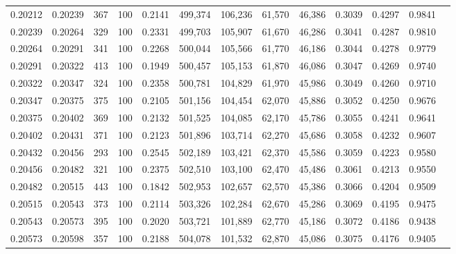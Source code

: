 \begin{tabular}{rrrrrrrrrrrrr}
0.20212 & 0.20239 &   367 & 100 &                                     0.2141 & 499,374 & 106,236 &  61,570 &  46,386 & 0.3039 & 0.4297 & 0.9841 \\
0.20239 & 0.20264 &   329 & 100 &                                     0.2331 & 499,703 & 105,907 &  61,670 &  46,286 & 0.3041 & 0.4287 & 0.9810 \\
0.20264 & 0.20291 &   341 & 100 &                                     0.2268 & 500,044 & 105,566 &  61,770 &  46,186 & 0.3044 & 0.4278 & 0.9779 \\
0.20291 & 0.20322 &   413 & 100 &                                     0.1949 & 500,457 & 105,153 &  61,870 &  46,086 & 0.3047 & 0.4269 & 0.9740 \\
0.20322 & 0.20347 &   324 & 100 &                                     0.2358 & 500,781 & 104,829 &  61,970 &  45,986 & 0.3049 & 0.4260 & 0.9710 \\
0.20347 & 0.20375 &   375 & 100 &                                     0.2105 & 501,156 & 104,454 &  62,070 &  45,886 & 0.3052 & 0.4250 & 0.9676 \\
0.20375 & 0.20402 &   369 & 100 &                                     0.2132 & 501,525 & 104,085 &  62,170 &  45,786 & 0.3055 & 0.4241 & 0.9641 \\
0.20402 & 0.20431 &   371 & 100 &                                     0.2123 & 501,896 & 103,714 &  62,270 &  45,686 & 0.3058 & 0.4232 & 0.9607 \\
0.20432 & 0.20456 &   293 & 100 &                                     0.2545 & 502,189 & 103,421 &  62,370 &  45,586 & 0.3059 & 0.4223 & 0.9580 \\
0.20456 & 0.20482 &   321 & 100 &                                     0.2375 & 502,510 & 103,100 &  62,470 &  45,486 & 0.3061 & 0.4213 & 0.9550 \\
0.20482 & 0.20515 &   443 & 100 &                                     0.1842 & 502,953 & 102,657 &  62,570 &  45,386 & 0.3066 & 0.4204 & 0.9509 \\
0.20515 & 0.20543 &   373 & 100 &                                     0.2114 & 503,326 & 102,284 &  62,670 &  45,286 & 0.3069 & 0.4195 & 0.9475 \\
0.20543 & 0.20573 &   395 & 100 &                                     0.2020 & 503,721 & 101,889 &  62,770 &  45,186 & 0.3072 & 0.4186 & 0.9438 \\
0.20573 & 0.20598 &   357 & 100 &                                     0.2188 & 504,078 & 101,532 &  62,870 &  45,086 & 0.3075 & 0.4176 & 0.9405 \\

\end{tabular}
